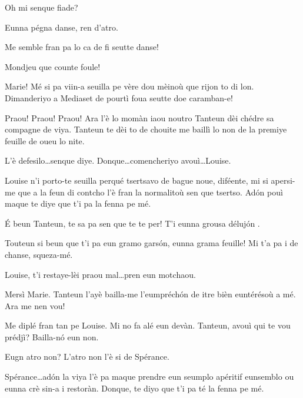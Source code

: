 \begin{drama}
\Alicespeaks{} Oh mi senque fiade?

\Tanteunspeaks Eunna pégna danse, ren d'atro.

\Sperancespeaks Me semble fran pa lo ca de fi seutte danse!

\Tanteunspeaks Mondjeu que counte foule!


\Alicespeaks Marie! Mé si pa viin-a seuilla pe vère dou mèinoù que rijon to di lon. Dimanderiyo a Mediaset de pourtì foua seutte doe caramban-e!

\Mariespeaks Praou! Praou! Praou! Ara l'è lo mo\-màn iaou noutro Tanteun dèi chédre sa compagne de viya. Tanteun te dèi to de chouite me baillì lo non de la premiye feuille de oueu lo nite.

\Tanteunspeaks{} L'è defesilo\ldots senque diye. Donque\ldots comencheriyo avouì\ldots Louise.


\Tanteunspeaks Louise n'i porto-te seuilla perqué tsertsavo de bague nou\-e, diféente, mi si apersi-me que a la feun di contcho l'è fran la normalitoù sen que tsertso. Ad\'on pouì maque te diye que t'i pa la fenna pe mé.

\Louisespeaks {} \'E beun Tanteun, te sa pa sen que te te per! T'i eunna grousa déluj\'on .

\Tanteunspeaks Touteun si beun que t'i pa eun gramo gars\'on,  eun\-na grama feuille! Mi t'a pa i de chanse, squeza-mé.

\Mariespeaks Louise, t’i restaye-lèi praou mal\ldots pren eun motchaou.


\Louisespeaks Mersì Marie. Tanteun l’ayè bailla-me l’eumpréch\'on de itre bièn euntérésoù a mé. Ara me nen vou!


\Mariespeaks Me diplé fran tan pe Louise. Mi no fa alé eun devàn. Tanteun, avouì qui te vou prédjì? Bailla-n\'o eun non.

\Tanteunspeaks Eugn atro non? L'atro non l'è si de Spérance.


\Tanteunspeaks Spérance\ldots ad\'on la viya l'è pa maque prendre eun seumplo apéritif eunsemblo ou eunna crè sin-a i restoràn. Donque, te diyo que t'i pa té la fenna pe mé.


\end{drama}
